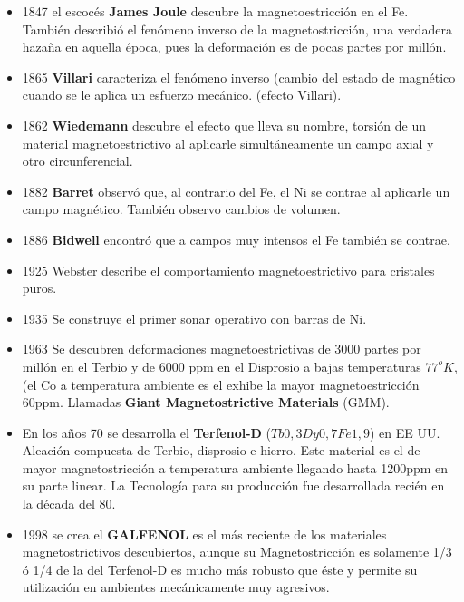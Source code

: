 \begin{itemize}
	\item 1847 el escocés \textbf{James Joule} descubre la magnetoestricción en el Fe. También describió el fenómeno inverso de la magnetostricción, una verdadera hazaña en aquella época, pues la deformación es de pocas partes por millón.
	
	\item 1865 \textbf{Villari} caracteriza el fenómeno inverso (cambio del estado de magnético cuando se le aplica un esfuerzo mecánico. (efecto Villari).
	
	\item 1862 \textbf{Wiedemann} descubre el efecto que lleva su nombre, torsión de un material magnetoestrictivo al aplicarle simultáneamente un campo axial y otro circunferencial.
	
	\item 1882 \textbf{Barret} observó que, al contrario del Fe, el Ni se contrae al aplicarle un campo magnético. También observo cambios de volumen.

	\item 1886 \textbf{Bidwell} encontró que a campos muy intensos el Fe también se contrae.
	
	\item 1925 {Webster} describe el comportamiento magnetoestrictivo para cristales puros.
	
	\item 1935 Se construye el primer sonar operativo con barras de Ni.

	\item 1963 Se descubren deformaciones magnetoestrictivas de 3000 partes por millón en el Terbio y de 6000 ppm en el Disprosio a bajas temperaturas $77^{o}K$, (el Co a temperatura ambiente es el exhibe la mayor magnetoestricción 60ppm. Llamadas \textbf{Giant Magnetostrictive Materials} (GMM).

	\item En los años 70 se desarrolla el \textbf{Terfenol-D} ($Tb0,3Dy0,7Fe1,9$) en EE UU. Aleación compuesta de Terbio, disprosio e hierro. Este material es el de mayor magnetostricción a temperatura ambiente llegando hasta 1200ppm en su parte linear. La Tecnología para su producción fue desarrollada recién en la década del 80.	

	\item 1998 se crea el \textbf{GALFENOL} es el más reciente de los materiales magnetostrictivos descubiertos, aunque su Magnetostricción es solamente 1/3 ó 1/4 de la del Terfenol-D es mucho más robusto que éste y permite su utilización en ambientes mecánicamente muy agresivos.

\end{itemize}


